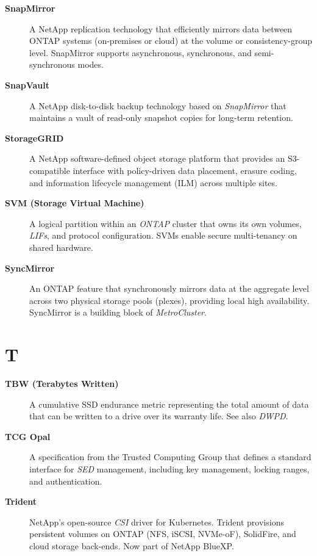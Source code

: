 \begin{description}
\item[\textbf{SnapMirror}]
A NetApp replication technology that efficiently mirrors data between ONTAP
systems (on-premises or cloud) at the volume or consistency-group level.
SnapMirror supports asynchronous, synchronous, and semi-synchronous modes.

\item[\textbf{SnapVault}]
A NetApp disk-to-disk backup technology based on \textit{SnapMirror} that
maintains a vault of read-only snapshot copies for long-term retention.

\item[\textbf{StorageGRID}]
A NetApp software-defined object storage platform that provides an
S3-compatible interface with policy-driven data placement, erasure coding,
and information lifecycle management (ILM) across multiple sites.

\item[\textbf{SVM (Storage Virtual Machine)}]
A logical partition within an \textit{ONTAP} cluster that owns its own
volumes, \textit{LIFs}, and protocol configuration. SVMs enable secure
multi-tenancy on shared hardware.

\item[\textbf{SyncMirror}]
An ONTAP feature that synchronously mirrors data at the aggregate level
across two physical storage pools (plexes), providing local high
availability. SyncMirror is a building block of \textit{MetroCluster}.

\end{description}

\section*{T}

\begin{description}

\item[\textbf{TBW (Terabytes Written)}]
A cumulative SSD endurance metric representing the total amount of data
that can be written to a drive over its warranty life. See also
\textit{DWPD}.

\item[\textbf{TCG Opal}]
A specification from the Trusted Computing Group that defines a standard
interface for \textit{SED} management, including key management, locking
ranges, and authentication.

\item[\textbf{Trident}]
NetApp's open-source \textit{CSI} driver for Kubernetes. Trident provisions
persistent volumes on ONTAP (NFS, iSCSI, NVMe-oF), SolidFire, and cloud
storage back-ends. Now part of NetApp BlueXP.

\end{description}

